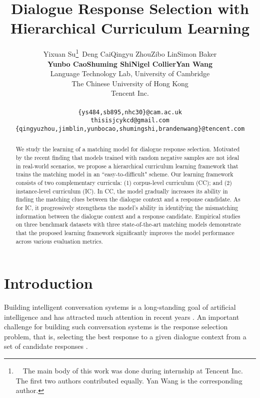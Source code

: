 \documentclass[11pt,a4paper]{article}
\title{Dialogue Response Selection with Hierarchical Curriculum Learning}
\author{Yixuan Su\thanks{~~The main body of this work was done during internship at Tencent Inc. The first two authors contributed equally. Yan Wang is the corresponding
author.}~\quad Deng Cai\quad  Qingyu Zhou\quad Zibo Lin\quad Simon Baker\quad \\
\textbf{Yunbo Cao}\quad \textbf{Shuming Shi}\quad \textbf{Nigel Collier}\quad \textbf{Yan Wang}  \\
Language Technology Lab, University of Cambridge \\
The Chinese University of Hong Kong \\
Tencent Inc.\\

\\ {\tt \{ys484,sb895,nhc30\}@cam.ac.uk}\\ {\tt thisisjcykcd@gmail.com} \\ {\tt \{qingyuzhou,jimblin,yunbocao,shumingshi,brandenwang\}@tencent.com}\\
}
\date{}
\begin{document}
\maketitle
\begin{abstract}
We study the learning of a matching model for dialogue response selection. Motivated by the recent finding that models trained with random negative samples are not ideal in real-world scenarios, we propose a hierarchical curriculum learning framework that trains the matching model in an ``easy-to-difficult" scheme. Our learning framework consists of two complementary curricula: (1) corpus-level curriculum (CC); and (2) instance-level curriculum (IC). In CC, the model gradually increases its ability in finding the matching clues between the dialogue context and a response candidate. As for IC, it progressively strengthens the model's ability in identifying the mismatching information between the dialogue context and a response candidate. Empirical studies on three benchmark datasets with three state-of-the-art matching models demonstrate that the proposed learning framework significantly improves the model performance across various evaluation metrics.\end{abstract}


\section{Introduction}
\label{sec:intro}
Building intelligent conversation systems is a long-standing goal of artificial intelligence and has attracted much attention in recent years \cite{DBLP:journals/corr/abs-1801-01957,DBLP:conf/naacl/KollarBSOCMKSM18}. An important challenge for building such conversation systems is the response selection problem, that is, selecting the best response to a given dialogue context from a set of candidate responses \cite{DBLP:conf/emnlp/RitterCD11}.
\end{document}
